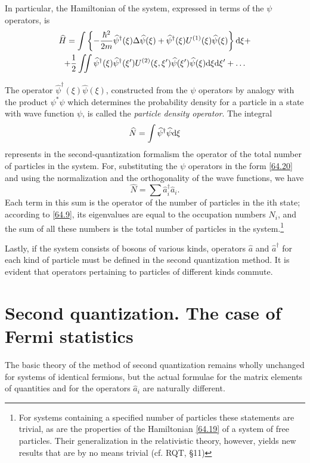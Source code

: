 In particular, the Hamiltonian of the system, expressed in terms of the $\psi$ operators, is
\begin{multline}\label{64.25}
\widehat{H}=\int\left\{-\frac{\hbar^2}{2m}\widehat{\psi}^\dagger(\xi)\Delta\widehat{\psi}(\xi)+\widehat{\psi}^\dagger(\xi)U^{(1)}(\xi)\widehat{\psi}(\xi) \right\}\mathrm{d}\xi+\\
+\frac{1}{2}\iint\widehat{\psi}^\dagger(\xi)\widehat{\psi}^\dagger(\xi')U^{(2)}(\xi,\xi')\widehat{\psi}(\xi')\widehat{\psi}(\xi)\mathrm{d}\xi\mathrm{d}\xi'+\dots
\end{multline}



The operator $ \hat{\psi}^\dagger(\xi)\hat{\psi}(\xi) $, constructed from the $\psi$ operators by analogy with the product $ \psi^*\psi $ which determines the probability density for a particle in a state with wave function $\psi$, is called the \textit{particle density operator}. The integral
\begin{equation}\label{64.26}
\widehat{N}=\int\widehat{\psi}^\dagger\widehat{\psi}\mathrm{d}\xi
\end{equation}
represents in the second-quantization formalism the operator of the total number of particles in the system. For, substituting the $\psi$ operators in the form \eqref{64.20} and using the normalization and the orthogonality of the wave functions, we have
\[ \hat{N}=\sum\hat{a}_i^\dagger\hat{a}_i. \]
Each term in this sum is the operator of the number of particles in the ith state; according to \eqref{64.9}, its eigenvalues are equal to the occupation numbers $ N_i $, and the sum of all these numbers is the total number of particles in the system.\footnote{For systems containing a specified number of particles these statements are trivial, as are the properties of the Hamiltonian \eqref{64.19} of a system of free particles. Their generalization in the relativistic theory, however, yields new results that are by no means trivial (cf. RQT, \S11)
}

Lastly, if the system consists of bosons of various kinds, operators $\hat{a}$ and $\hat{a}^\dagger$ for each kind of particle must be defined in the second quantization method. It is evident that operators pertaining to particles of different kinds commute.
\section{Second quantization. The case of Fermi statistics}\label{Second quantization. The case of Fermi statistics}
The basic theory of the method of second quantization remains wholly unchanged for systems of identical fermions, but the actual formulae for the matrix elements of quantities and for the operators $ \hat{a}_i $ are naturally different.

